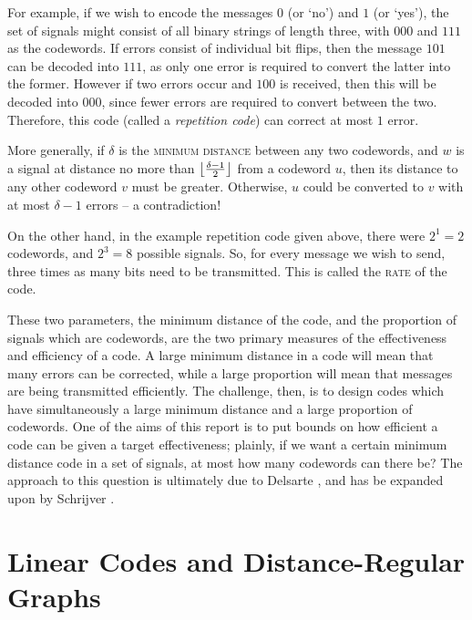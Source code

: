 \documentclass{report}
\begin{document}
    For example, if we wish to encode the messages $0$ (or `no') and $1$ (or
    `yes'), the set of signals might consist of all binary strings of length
    three, with $000$ and $111$ as the codewords.  If errors consist of
    individual bit flips, then the message $101$ can be decoded into $111$, as
    only one error is required to convert the latter into the former.  However
    if two errors occur and $100$ is received, then this will be decoded into
    $000$, since fewer errors are required to convert between the two.
    Therefore, this code (called a \textit{repetition code}) can correct at most
    $1$ error.

    More generally, if $\delta$ is the \textsc{minimum distance} between any two
    codewords, and $w$ is a signal at distance no more than $\left\lfloor \frac{\delta
    - 1}{2} \right\rfloor$ from a codeword $u$, then its distance to any other codeword $v$
    must be greater.  Otherwise, $u$ could be converted to $v$ with at most
    $\delta - 1$ errors -- a contradiction!

    On the other hand, in the example repetition code given above, there were
    $2^1 = 2$ codewords, and $2^3 = 8$ possible signals.  So, for every message
    we wish to send, three times as many bits need to be transmitted.  This is
    called the \textsc{rate} of the code.

    These two parameters, the minimum distance of the code, and the proportion
    of signals which are codewords, are the two primary measures of the
    effectiveness and efficiency of a code.  A large minimum distance in a code
    will mean that many errors can be corrected, while a large proportion will
    mean that messages are being transmitted efficiently.  The challenge, then,
    is to design codes which have simultaneously a large minimum distance and a
    large proportion of codewords.  One of the aims of this report is to put
    bounds on how efficient a code can be given a target effectiveness; plainly,
    if we want a certain minimum distance code in a set of signals, at most how
    many codewords can there be?  The approach to this question is ultimately
    due to Delsarte \cite{delsarte}, and has be expanded upon by Schrijver
    \cite{schrijver}.

  \section{Linear Codes and Distance-Regular
    Graphs}\label{sec:intro:linear->drg}
\end{document}
